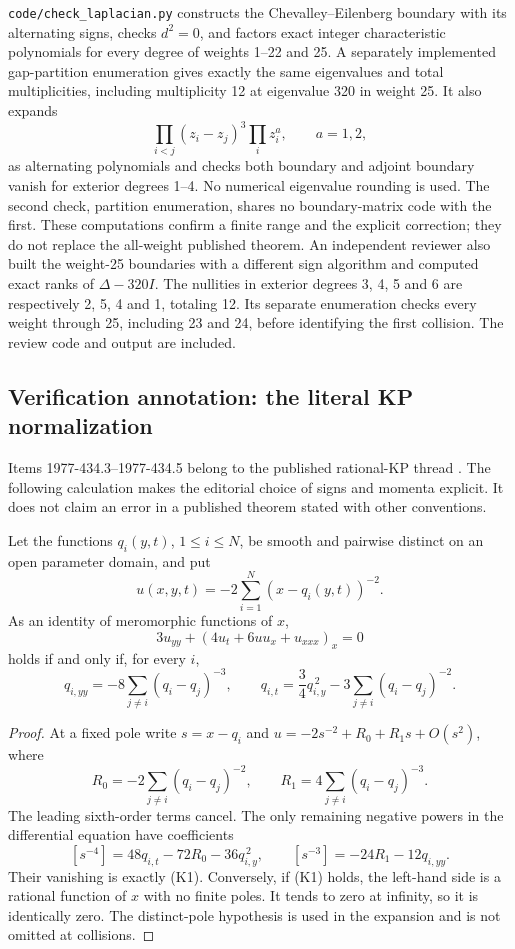 \begin{remark}\oursComputed{}
\texttt{code/check\_laplacian.py} constructs the Chevalley--Eilenberg
boundary with its alternating signs, checks \(d^2=0\), and factors exact
integer characteristic polynomials for every degree of weights 1--22 and
25. A separately implemented gap-partition enumeration gives exactly the
same eigenvalues and total multiplicities, including multiplicity 12 at
eigenvalue 320 in weight 25. It also expands
\[
 \prod_{i<j}(z_i-z_j)^3\prod_i z_i^a,\qquad a=1,2,
\]
as alternating polynomials and checks both boundary and adjoint boundary
vanish for exterior degrees 1--4. No numerical eigenvalue rounding is
used. The second check, partition enumeration, shares no boundary-matrix
code with the first. These computations confirm a finite range and the
explicit correction; they do not replace the all-weight published theorem.
An independent reviewer also built the weight-25 boundaries with a different
sign algorithm and computed exact ranks of \(\Delta-320I\). The nullities
in exterior degrees 3, 4, 5 and 6 are respectively 2, 5, 4 and 1, totaling
12. Its separate enumeration checks every weight through 25, including
23 and 24, before identifying the first collision. The review code and
output are included.
\end{remark}

\subsection{Verification annotation: the literal KP normalization}
\label{dev:1977-kp-check}
Items 1977-434.3--1977-434.5 belong to the published rational-KP thread
\citep[Theorem~3 and its corollaries]{krichever1978rational}. The following
calculation makes the editorial choice of signs and momenta explicit. It
does not claim an error in a published theorem stated with other conventions.

\begin{proposition}\ours{}
Let the functions \(q_i(y,t)\), \(1\leq i\leq N\), be smooth and pairwise
distinct on an open parameter domain, and put
\[
 u(x,y,t)=-2\sum_{i=1}^N(x-q_i(y,t))^{-2}.
\]
As an identity of meromorphic functions of \(x\),
\[
 3u_{yy}+(4u_t+6uu_x+u_{xxx})_x=0
\]
holds if and only if, for every \(i\),
\[
 q_{i,yy}=-8\sum_{j\ne i}(q_i-q_j)^{-3},\qquad
 q_{i,t}=\frac34q_{i,y}^{\,2}-3\sum_{j\ne i}(q_i-q_j)^{-2}.
 \tag{K1}
\]
\end{proposition}
\begin{proof}
At a fixed pole write \(s=x-q_i\) and
\(u=-2s^{-2}+R_0+R_1s+O(s^2)\), where
\[
 R_0=-2\sum_{j\ne i}(q_i-q_j)^{-2},\qquad
 R_1=4\sum_{j\ne i}(q_i-q_j)^{-3}.
\]
The leading sixth-order terms cancel. The only remaining negative powers
in the differential equation have coefficients
\[
 [s^{-4}]=48q_{i,t}-72R_0-36q_{i,y}^{\,2},\qquad
 [s^{-3}]=-24R_1-12q_{i,yy}.
\]
Their vanishing is exactly (K1). Conversely, if (K1) holds, the left-hand
side is a rational function of \(x\) with no finite poles. It tends to
zero at infinity, so it is identically zero. The distinct-pole hypothesis
is used in the expansion and is not omitted at collisions.
\end{proof}

